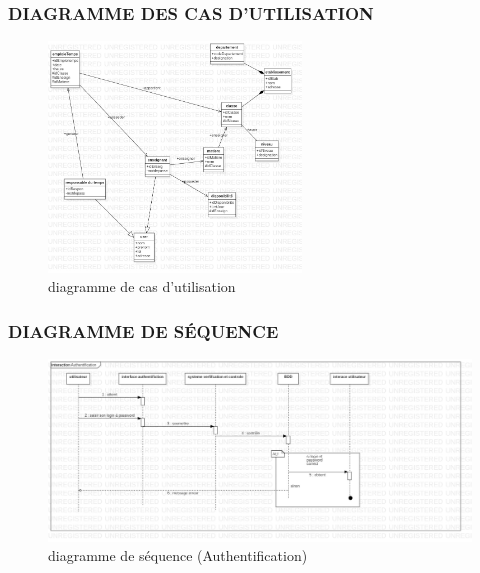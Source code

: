 \documentclass[english,12pt,a4paper]{report}
\begin{document}
\subsubsection{DIAGRAMME DES CAS D'UTILISATION}
\begin{figure}[h]
	\centering
	\includegraphics[width=0.6\textwidth]{DiagrammeClasse.jpg}
	\caption{diagramme de cas d'utilisation}
	\label{fig3: diagramme de cas d'utilisation}
\end{figure} \par \par
\subsubsection{DIAGRAMME DE SÉQUENCE}
\begin{figure}[h]
	\centering
	\begin{center}
		\includegraphics*[height=0.3 \textheight ]{AuthentificationSequence.jpg}
	\end{center}
	\caption{diagramme de séquence (Authentification)}
	\label{fig4: diagramme de sequence Authentification}
\end{figure}
\end{document}
